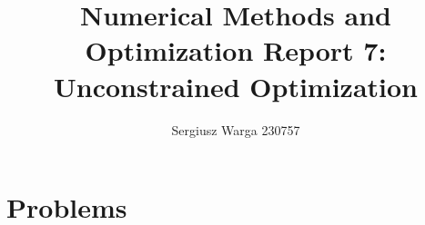 \documentclass[a4paper]{article}
\title{Numerical Methods and Optimization Report 7:
  Unconstrained Optimization}
\author{Sergiusz Warga 230757}
\date{}
\begin{document}
\maketitle
\tableofcontents
\pagebreak

\section{Problems}



\clearpage

\nocite{Meyer, GoluVanl96, Zdunek, NoceWrig99}


\end{document}
